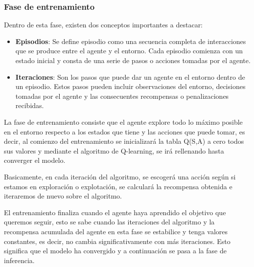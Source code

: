 \subsubsection{Fase de entrenamiento}
\label{sec:entrenamiento}
 Dentro de esta fase, existen dos conceptos importantes a destacar:
 \begin{itemize}
  \item \textbf{Episodios}: Se define episodio como una secuencia completa de interacciones que se produce entre el agente y el entorno. Cada episodio comienza con un estado inicial y consta de una serie 
  de pasos o acciones tomadas por el agente.
  \item \textbf{Iteraciones}: Son los pasos que puede dar un agente en el entorno dentro de un episodio. Estos pasos pueden incluir observaciones del entorno, decisiones tomadas por el agente
  y las consecuentes recompensas o penalizaciones recibidas.
\end{itemize}

 La fase de entrenamiento consiste que el agente explore todo lo máximo posible en el entorno respecto a los estados que tiene y las acciones que puede tomar, es decir, al comienzo del 
 entrenamiento se inicializará la tabla Q(S,A) a cero todos sus valores y mediante el algoritmo de Q-learning, se irá rellenando hasta converger el modelo. \newline
 
 Basicamente, en cada iteración del algoritmo, se escogerá una acción según si estamos en exploración o explotación, se calculará la recompensa obtenida e iteraremos de nuevo sobre el algoritmo.

 El entrenamiento finaliza cuando el agente haya aprendido el objetivo que queremos seguir, esto se sabe cuando las iteraciones del algoritmo y la recompensa acumulada del agente en esta 
 fase se estabilice y tenga valores constantes, es decir, no cambia significativamente con más iteraciones. Esto significa que el modelo ha convergido y a continuación se pasa
 a la fase de inferencia. \newline

